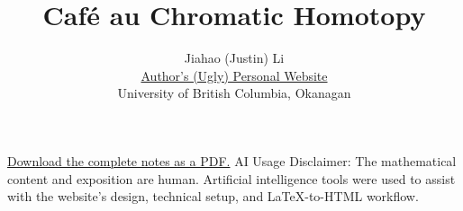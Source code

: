 \documentclass[11pt]{book}
\title{Café au Chromatic Homotopy}
\author{Jiahao (Justin) Li\\ \href{https://justinli1128.github.io/jiahaoliAcademicWebsite/}{Author's (Ugly) Personal Website}\\University of British Columbia, Okanagan}
\date{}
\begin{document}
\maketitle

\ifdefined\HCode
\noindent\href{cafe-au-chromatic-homotopy.pdf}{Download the complete notes as a PDF.}
\fi
AI Usage Disclaimer: The mathematical content and exposition are human. Artificial intelligence tools were used to assist with the website’s design, technical setup, and LaTeX-to-HTML workflow.
\tableofcontents







% 
\backmatter


\end{document}
